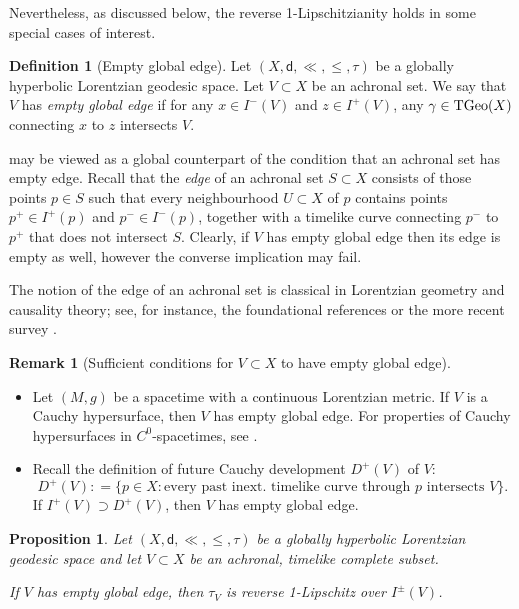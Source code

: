 \documentclass[a4paper,10pt]{article}
\newcommand{\TGeo}{{\rm TGeo}}
\newcommand{\sfd}{\mathsf d}
\theoremstyle{plain}
\newtheorem{proposition}[lemma]{Proposition}
\theoremstyle{definition}
\newtheorem{definition}[lemma]{Definition}
\newtheorem{remark}[lemma]{Remark}
\numberwithin{equation}{section}
\begin{document}
Nevertheless, as discussed below,   the reverse 1-Lipschitzianity holds in some special cases of interest. 

\begin{definition}[Empty global edge]
\label{D:GLEdge}
Let $(X,\sfd, \ll, \leq, \tau)$ be a globally hyperbolic Lorentzian geodesic space. 
Let $V\subset X$ be an achronal set. We say that $V$ has \emph{empty global edge} if for any $x \in I^-(V)$ and $z\in I^+(V)$,
any $\gamma\in \TGeo(X)$ connecting $x$ to $z$  intersects $V$. 
\end{definition}

 may be viewed as a global counterpart of the condition that an achronal set has empty edge. Recall that the \emph{edge} of an achronal set \( S \subset X \) consists of those points \( p \in S \) such that every neighbourhood \( U \subset X \) of \( p \) contains points \( p^+ \in I^+(p) \) and \( p^- \in I^-(p) \), together with a timelike curve connecting \( p^- \) to \( p^+ \) that does not intersect \( S \).  Clearly, if $V$ has empty global edge then its edge is empty as well, however the converse implication may fail.

The notion of the edge of an achronal set is classical in Lorentzian geometry and causality theory; see, for instance, the foundational references \cite{PenroseDiffTop,HawEll} or the more recent survey \cite{Ming-SurveyLCT}. 

\begin{remark}[Sufficient conditions for  $V\subset X$ to have empty global edge]
\begin{itemize}
\item Let $(M,g)$ be a spacetime with a continuous Lorentzian metric. If $V$ is a Cauchy hypersurface, then $V$ has empty global edge. For properties of Cauchy hypersurfaces in $C^0$-spacetimes, see \cite{SaC0}.
\item  Recall the definition of future Cauchy development  $D^+(V)$ of $V$: 
\[
D^+(V) : = \{ p \in X \colon \text{every past inext. timelike curve through $p$ intersects $V$}\}.
\]
If $I^+(V) \supset D^+(V)$, then $V$ has empty global edge. 
\end{itemize}
\end{remark}



\begin{proposition}\label{P:1reverseglob}
Let $(X,\sfd, \ll, \leq, \tau)$ be a globally hyperbolic Lorentzian geodesic space and let $V\subset X$ be an achronal, timelike complete subset. 

If $V$ has empty global edge, then
$\tau_V$ is reverse 1-Lipschitz over $I^\pm(V)$.
\end{proposition}
\end{document}

